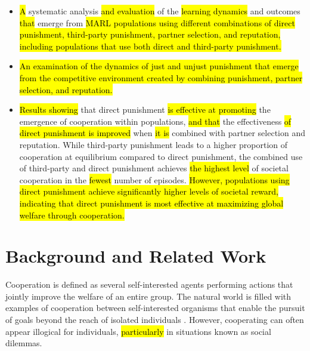 \documentclass[sn-aps,numbered]{sn-jnl}%
\theoremstyle{thmstyleone}%
\theoremstyle{thmstyletwo}%
\theoremstyle{thmstylethree}%
\begin{document}
\begin{itemize}
  \item \hl{A} systematic analysis \hl{and evaluation} of the \hl{learning dynamics} and outcomes \hl{that} emerge from \hl{MARL populations using different combinations of direct punishment, third-party punishment, partner selection, and reputation, including populations that use both direct and third-party punishment.}
  \item \hl{An examination of the dynamics of just and unjust punishment that emerge from the competitive environment created by combining punishment, partner selection, and reputation.}
  \item \hl{Results showing} that direct punishment \hl{is effective at promoting} the emergence of cooperation within populations, \hl{and that} the effectiveness \hl{of direct punishment is improved} when \hl{it is} combined with partner selection and reputation. While third-party punishment leads to a higher proportion of cooperation at equilibrium compared to direct punishment, the combined use of third-party and direct punishment achieves \hl{the highest level} of societal cooperation in the \hl{fewest} number of episodes. \hl{However, populations using direct punishment achieve significantly higher levels of societal reward, indicating that direct punishment is most effective at maximizing global welfare through cooperation.}
\end{itemize} 

\section{Background and Related Work}

Cooperation is defined as several self-interested agents performing actions that jointly improve the welfare of an entire group. The natural world is filled with examples of cooperation between self-interested organisms that enable the pursuit of goals beyond the reach of isolated individuals \citep{open_problems_coop_ai}. However, cooperating can often appear illogical for individuals, \hl{particularly} in situations known as social dilemmas. 
\end{document}
